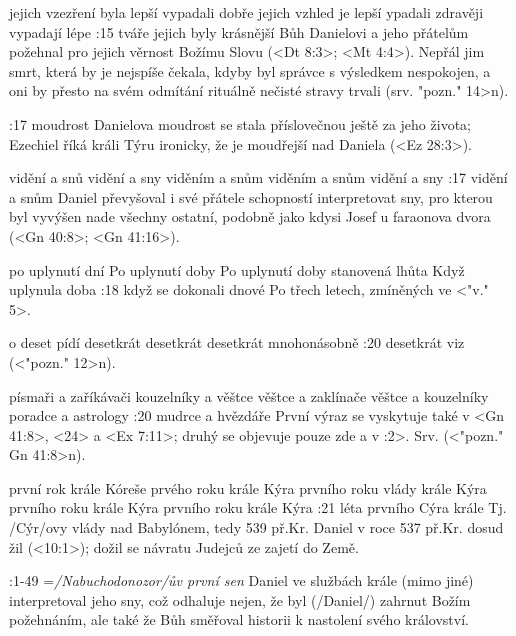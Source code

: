     {jejich vzezření byla lepší} %
    {vypadali dobře}  %
    {jejich vzhled je lepší} %
    {ypadali zdravěji}  %
    {vypadají lépe}  %
:15 {tváře jejich byly krásnější} Bůh Danielovi a jeho přátelům požehnal pro jejich věrnost Božímu Slovu (<Dt 8:3>; <Mt 4:4>). Nepřál jim smrt, která by je nejspíše čekala, kdyby byl správce s výsledkem nespokojen, a oni by přesto na svém odmítání rituálně nečisté stravy trvali
(srv. \<"pozn." 14>n). 

:17 {moudrost} Danielova moudrost se stala příslovečnou ještě za jeho života; Ezechiel říká králi Týru ironicky, že je moudřejší nad Daniela (<Ez 28:3>). 

    {vidění a snů} %
    {vidění a sny}  %
    {viděním a snům} %
    {viděním a snům}  %
    {vidění a sny}  %
:17 {vidění a snům} Daniel převyšoval i své přátele schopností interpretovat sny, pro kterou byl vyvýšen nade všechny ostatní, podobně jako kdysi Josef u faraonova dvora (<Gn 40:8>; <Gn 41:16>). 

    {po uplynutí dní} %
    {Po uplynutí doby}  %
    {Po uplynutí doby} %
    {stanovená lhůta}  %
    {Když uplynula doba}  %
:18 {když se dokonali dnové} Po třech letech, zmíněných ve  <"v." 5>.

    {o deset pídí} %
    {desetkrát}  %
    {desetkrát} %
    {desetkrát}  %
    {mnohonásobně}  %
:20 {desetkrát} viz (<"pozn." 12>n).

    {písmaři a zaříkávači} %
    {kouzelníky a věštce}  %
    {věštce a zaklínače} %
    {věštce a kouzelníky}  %
    {poradce a astrology}  %
:20 {mudrce a hvězdáře} První výraz se vyskytuje také v <Gn 41:8>, <24> a <Ex 7:11>; druhý se objevuje pouze zde a v :2>. 
Srv. (<"pozn." Gn 41:8>n). \dopsat %

    {první rok krále Kóreše} %
    {prvého roku krále Kýra}  %
    {prvního roku vlády krále Kýra} %
    {prvního roku krále Kýra}  %
    {prvního roku krále Kýra}  %
:21 {léta prvního Cýra krále} Tj. \x/Cýr/ovy vlády nad Babylónem, tedy 539 př.Kr. Daniel v roce 537 př.Kr. dosud žil (<10:1>); dožil se návratu Judejců ze zajetí do Země.

:1-49 {}={\it\x/Nabuchodonozor/ův první sen\/} Daniel ve službách krále (mimo jiné) interpretoval jeho sny, což odhaluje nejen, že  byl (\x/Daniel/) zahrnut Božím požehnáním, ale také že Bůh směřoval historii  k nastolení svého království.

